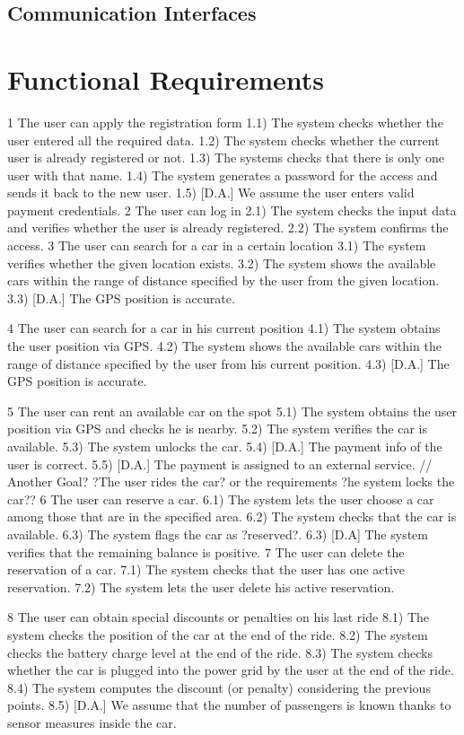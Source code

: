 \documentclass[11pt,a4paper]{report}
\begin{document}
\subsection{Communication Interfaces}
\section{Functional Requirements}
1 The user can apply the registration form 
1.1)	The system checks whether the user entered all the required data.
1.2)	The system checks whether the current user is already registered or not.
1.3)	The systems checks that there is only one user with that name.
1.4)	The system generates a password for the access and sends it back to the new user.
1.5)	[D.A.] We assume the user enters valid payment credentials.
2 The user can log in
2.1) The system checks the input data and verifies whether the user is already registered.
2.2) The system confirms the access.
3 The user can search for a car in a certain location
3.1) The system verifies whether the given location exists.
3.2) The system shows the available cars within the range of distance specified by the user from the given location.
3.3) [D.A.] The GPS position is accurate.

4 The user can search for a car in his current position
4.1) The system obtains the user position via GPS.
4.2) The system shows the available cars within the range of distance specified by the user from his current position.
4.3) [D.A.] The GPS position is accurate.


5 The user can rent an available car on the spot
5.1) The system obtains the user position via GPS and checks he is nearby.
5.2) The system verifies the car is available.
5.3) The system unlocks the car.
5.4) [D.A.] The payment info of the user is correct.
5.5) [D.A.] The payment is assigned to an external service.
// Another Goal? ?The user rides the car? or the requirements ?he system locks the car??
6 The user can reserve a car.
6.1) The system lets the user choose a car among those that are in the specified area.
6.2) The system checks that the car is available.
6.3) The system flags the car as ?reserved?.
6.3) [D.A] The system verifies that the remaining balance is positive. 
7 The user can delete the reservation of a car.
7.1) The system checks that the user has one active reservation.
7.2) The system lets the user delete his active reservation.

 8 The user can obtain special discounts or penalties on his last ride
8.1) The system checks the position of the car at the end of the ride.
8.2) The system checks the battery charge level at the end of the ride.
8.3) The system checks whether the car is plugged into the power grid by the user at the end of the ride.
8.4) The system computes the discount (or penalty) considering the previous points.
8.5) [D.A.] We assume that the number of passengers is known thanks to sensor measures inside the car.
\end{document}
